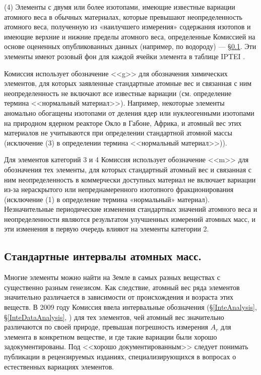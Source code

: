 \documentclass[a5paper,openany]{book}
\begin{document}
(4) Элементы с двумя или более изотопами, имеющие известные вариации атомного веса в обычных материалах, которые превышают неопределенность атомного веса, полученную из «наилучшего измерения» содержания изотопов и имеющие верхние и нижние пределы атомного веса, определенные Комиссией на основе оцененных опубликованных данных (например, по водороду) --- \S\ref{MassIntervals}. Эти элементы имеют розовый фон для каждой ячейки элемента в таблице IPTEI \cite{IPTEI}. 

Комиссия использует обозначение <<g>> для обозначения химических элементов, для которых заявленные стандартные атомные вес и связанная с ним неопределенность не включают все известные вариации (см. определение термина <<нормальный материал>>).
Например, некоторые элементы аномально обогащены изотопами от деления ядер или нуклеогенными
изотопами на природном ядерном реакторе Окло в Габоне, Африка, и атомный вес этих материалов
не учитываются при определении стандартной атомной массы (исключение (3) в определении термина
<<нормальный материал>>)). 

Для элементов категорий 3 и 4 Комиссия использует обозначение <<m>> для обозначения тех
элементы, для которых стандартный атомный вес и связанная с ним неопределенность в коммерчески доступных
материал не включает вариации из-за нераскрытого или непреднамеренного изотопного фракционирования (исключение (1) в определение термина «нормальный» материал). Незначительные периодические изменения стандартных значений атомного веса и неопределенности являются результатом улучшенных измерений атомных масс, и эти изменения в первую очередь влияют на элементы категории 2. 

\subsection{Стандартные интервалы атомных масс.} \label{MassIntervals}

Многие элементы можно найти на Земле в самых разных веществах с существенно разным генезисом. Как
следствие, атомный вес ряда элементов значительно различается в зависимости от происхождения и возраста этих веществ. В 2009 году Комиссия ввела интервальные обозначения (\S\ref{InteAnalysis}, \S\ref{InteDataAnalysis}, \cite{InteNotation}) для тех элементов, чей атомный вес 
значительно различаются по своей природе, превышая погрешность измерения $A_r$ для элемента в конкретном веществе, и где такие вариации были хорошо задокументированы. Под <<хорошо документированным>> следует понимать
публикации в рецензируемых изданиях, специализирующихся в вопросах о естественных вариациях элементов.
\end{document}
